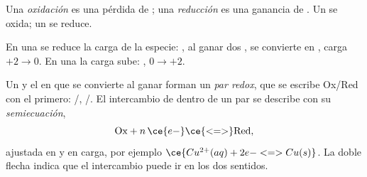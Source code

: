 \begin{definition}\label{def:g11:redox:oxidation}
Una \emph{oxidación} es una pérdida de ; una
\emph{reducción} es una ganancia de . Un
 se oxida; un  se reduce.
\end{definition}

\begin{remark}\label{rem:g11:redox:remember}
En una \emph{} se reduce la carga de la especie: ,
al ganar dos , se convierte en , carga $+2 \to 0$. En
una  la carga sube: , $0 \to +2$.
\end{remark}

\begin{definition}\label{def:g11:redox:couple}
Un  y el  en que se convierte al ganar 
forman un \emph{par redox}, que se escribe Ox/Red con el
 primero: /, /. El
intercambio de  dentro de un par se describe con su
\emph{semiecuación},
\[
  \text{Ox} + n\,\ce{e-} \ce{<=>} \text{Red}, %
\]
ajustada en  y en carga, por ejemplo
$\ce{Cu^{2+}(aq) + 2e- <=> Cu(s)}$. La doble flecha indica que el
intercambio puede ir en los dos sentidos.
\end{definition}

